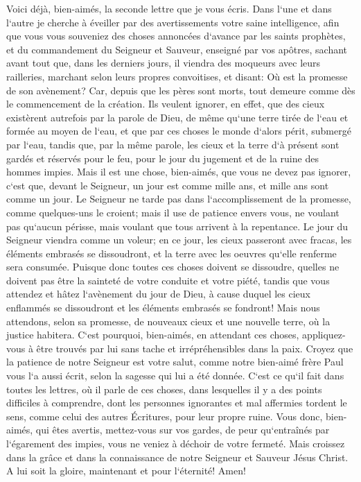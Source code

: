 \verse Voici déjà, bien-aimés, la seconde lettre que je vous écris. Dans l`une et dans l`autre je cherche à éveiller par des avertissements votre saine intelligence, 
\verse afin que vous vous souveniez des choses annoncées d`avance par les saints prophètes, et du commandement du Seigneur et Sauveur, 
\verse enseigné par vos apôtres, sachant avant tout que, dans les derniers jours, il viendra des moqueurs avec leurs railleries, marchant selon leurs propres convoitises, 
\verse et disant: Où est la promesse de son avènement? Car, depuis que les pères sont morts, tout demeure comme dès le commencement de la création. 
\verse Ils veulent ignorer, en effet, que des cieux existèrent autrefois par la parole de Dieu, de même qu`une terre tirée de l`eau et formée au moyen de l`eau, 
\verse et que par ces choses le monde d`alors périt, submergé par l`eau, 
\verse tandis que, par la même parole, les cieux et la terre d`à présent sont gardés et réservés pour le feu, pour le jour du jugement et de la ruine des hommes impies. 
\verse Mais il est une chose, bien-aimés, que vous ne devez pas ignorer, c`est que, devant le Seigneur, un jour est comme mille ans, et mille ans sont comme un jour. 
\verse Le Seigneur ne tarde pas dans l`accomplissement de la promesse, comme quelques-uns le croient; mais il use de patience envers vous, ne voulant pas qu`aucun périsse, mais voulant que tous arrivent à la repentance. 
\verse Le jour du Seigneur viendra comme un voleur; en ce jour, les cieux passeront avec fracas, les éléments embrasés se dissoudront, et la terre avec les oeuvres qu`elle renferme sera consumée. 
\verse Puisque donc toutes ces choses doivent se dissoudre, quelles ne doivent pas être la sainteté de votre conduite et votre piété, 
\verse tandis que vous attendez et hâtez l`avènement du jour de Dieu, à cause duquel les cieux enflammés se dissoudront et les éléments embrasés se fondront! 
\verse Mais nous attendons, selon sa promesse, de nouveaux cieux et une nouvelle terre, où la justice habitera. 
\verse C`est pourquoi, bien-aimés, en attendant ces choses, appliquez-vous à être trouvés par lui sans tache et irrépréhensibles dans la paix. 
\verse Croyez que la patience de notre Seigneur est votre salut, comme notre bien-aimé frère Paul vous l`a aussi écrit, selon la sagesse qui lui a été donnée. 
\verse C`est ce qu`il fait dans toutes les lettres, où il parle de ces choses, dans lesquelles il y a des points difficiles à comprendre, dont les personnes ignorantes et mal affermies tordent le sens, comme celui des autres Écritures, pour leur propre ruine. 
\verse Vous donc, bien-aimés, qui êtes avertis, mettez-vous sur vos gardes, de peur qu`entraînés par l`égarement des impies, vous ne veniez à déchoir de votre fermeté. 
\verse Mais croissez dans la grâce et dans la connaissance de notre Seigneur et Sauveur Jésus Christ. A lui soit la gloire, maintenant et pour l`éternité! Amen! 
